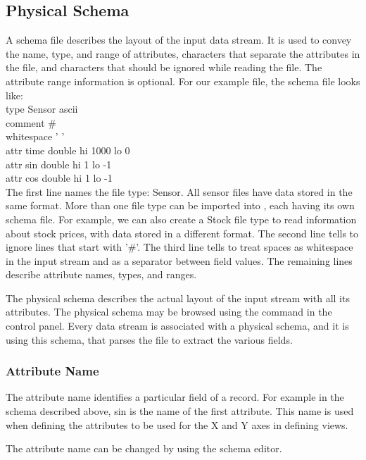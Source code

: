 \subsection{Physical Schema}

A schema file describes the layout of the input data stream. It is
used to convey the name, type, and range of attributes, characters
that separate the attributes in the file, and characters that should
be ignored while reading the file. The attribute range information is
optional. For our example file, the schema file looks like: \\

 type Sensor ascii \\
 comment \# \\
 whitespace ' ' \\
 attr time double hi 1000 lo 0 \\
 attr sin double hi 1 lo -1 \\
 attr cos double hi 1 lo -1 \\

The first line names the file type: Sensor. All sensor files have data
stored in the same format. More than one file type can be imported
into \Devise, each having its own schema file. For example, we can
also create a Stock file type to read information about stock prices,
with data stored in a different format. The second line tells \Devise
to ignore lines that start with '\#'. The third line tells \Devise to
treat spaces as whitespace in the input stream and as a separator
between field values. The remaining lines describe attribute names,
types, and ranges.

The physical schema describes the actual layout of the input stream
with all its attributes. The physical schema may be browsed using the
 command in the control panel. Every data stream is
associated with a physical schema, and it is using this schema, that
\Devise parses the file to extract the various fields.

\subsubsection{Attribute Name}

The attribute name identifies a particular field of a record. For
example in the schema described above, sin is the name of the first
attribute. This name is used when defining the attributes to be used
for the X and Y axes in defining views.

The attribute name can be changed by using the schema editor.

